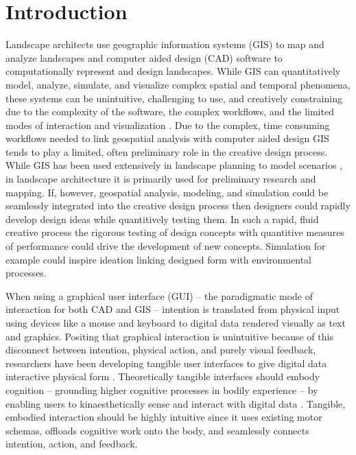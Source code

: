 \documentclass[Afour,sageh,times]{sagej}
\begin{document}
\maketitle


\section{Introduction}

Landscape architects use 
geographic information systems (GIS) to map and analyze landscapes
and computer aided design (CAD) software %
to computationally represent and design landscapes.
%
While GIS can quantitatively model, analyze, simulate, and visualize 
complex spatial and temporal phenomena,
these systems can be unintuitive, challenging to use, and creatively constraining
due to the complexity of the software, 
the complex workflows, 
and the limited modes of interaction and visualization 
\cite{Ratti2004}. 
%
Due to the complex, time consuming workflows 
needed to link geospatial analysis with computer aided design 
GIS tends to play a limited, often preliminary role in the creative design process.
%
While GIS has been used extensively in landscape planning 
to model scenarios \cite{Steinitz2004,Baker2004,Steinitz2012},
in landscape architecture
it is primarily used for preliminary research and mapping.
%
If, however, geospatial analysis, modeling, and simulation
could be seamlessly integrated into the creative design process 
then designers could rapidly develop design ideas
while quantitively testing them. 
%
In such a rapid, fluid creative process
the rigorous testing of design concepts 
with quantitive measures of performance 
could drive the development of new concepts.
%
Simulation for example could inspire ideation 
linking designed form with environmental processes. 

When using a graphical user interface (GUI) 
-- the paradigmatic mode of interaction for both CAD and GIS --  
intention is translated from physical input 
using devices like a mouse and keyboard 
to digital data rendered visually as text and graphics. 
%
Positing that graphical interaction is unintuitive
because of this disconnect between 
intention, physical action, and purely visual feedback,
researchers have been developing tangible user interfaces 
to give digital data interactive physical form 
\cite{Dourish2001,Ishii2008}. 
%
Theoretically tangible interfaces should embody cognition 
-- grounding higher cognitive processes in bodily experience --
by enabling users to kinaesthetically sense and interact with digital data
\cite{Kirsh2013}.
%
Tangible, embodied interaction should be highly intuitive 
since it 
uses existing motor schemas,  
offloads cognitive work onto the body,
and seamlessly connects intention, action, and feedback.
\end{document}
